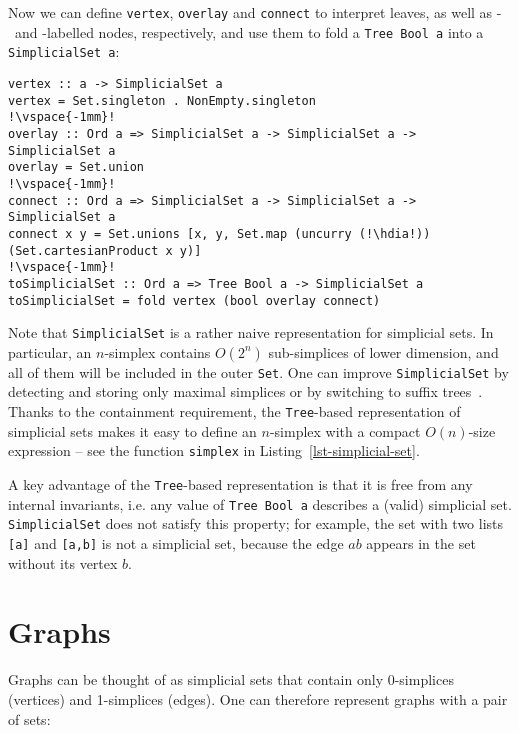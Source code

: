 \documentclass[english,submission]{programming}
\newcommand{\code}[1]{\lstinline[mathescape]|#1|}
\newcommand{\hcode}[1]{{\color{darkblue} \lstinline[keywordstyle={}]|#1|}} %
\newcommand{\hdia}{\,\text{\raisebox{-0.2mm}{\Large\color{darkblue} $\diamond$}}\,}
\newcommand{\zero}{\raisebox{-0.2mm}{\textcircled{0}}\xspace}
\newcommand{\one}{\raisebox{-0.2mm}{\textcircled{1}}\xspace}
\begin{document}
\noindent
Now we can define \hcode{vertex}, \hcode{overlay} and \hcode{connect} to
interpret leaves, as well as \zero-~and \one-labelled nodes, respectively, and
use them to fold a \hcode{Tree Bool a} into a \hcode{SimplicialSet a}:

\begin{lstlisting}
vertex :: a -> SimplicialSet a
vertex = Set.singleton . NonEmpty.singleton
!\vspace{-1mm}!
overlay :: Ord a => SimplicialSet a -> SimplicialSet a -> SimplicialSet a
overlay = Set.union
!\vspace{-1mm}!
connect :: Ord a => SimplicialSet a -> SimplicialSet a -> SimplicialSet a
connect x y = Set.unions [x, y, Set.map (uncurry (!\hdia!)) (Set.cartesianProduct x y)]
!\vspace{-1mm}!
toSimplicialSet :: Ord a => Tree Bool a -> SimplicialSet a
toSimplicialSet = fold vertex (bool overlay connect)
\end{lstlisting}

\noindent
Note that \hcode{SimplicialSet} is a rather naive representation for simplicial
sets. In particular, an $n$-simplex contains $O(2^n)$ sub-simplices of
lower dimension, and all of them will be included in the outer \hcode{Set}. One
can improve \hcode{SimplicialSet} by detecting and storing only maximal
simplices or by switching to suffix trees~\cite{weiner_suffix_trees}. Thanks to
the containment requirement, the \hcode{Tree}-based representation of simplicial
sets makes it easy to define an $n$-simplex with a compact $O(n)$-size
expression -- see the function \hcode{simplex} in Listing~\ref{lst-simplicial-set}.

A key advantage of the \hcode{Tree}-based representation is that it is free from
any internal invariants, i.e. any value of \hcode{Tree Bool a} describes a
(valid) simplicial set. \hcode{SimplicialSet} does not satisfy this property;
for example, the set with two lists \code{[a]} and \code{[a,b]} is not a
simplicial set, because the edge $\textit{ab}$ appears in the set without its
vertex $\textit{b}$.

\vspace{-2mm}
\section{Graphs}\label{sec-graph}

Graphs can be thought of as simplicial sets that contain only 0-simplices
(vertices) and 1-simplices (edges). One can therefore represent graphs with a
pair of sets:
\end{document}
